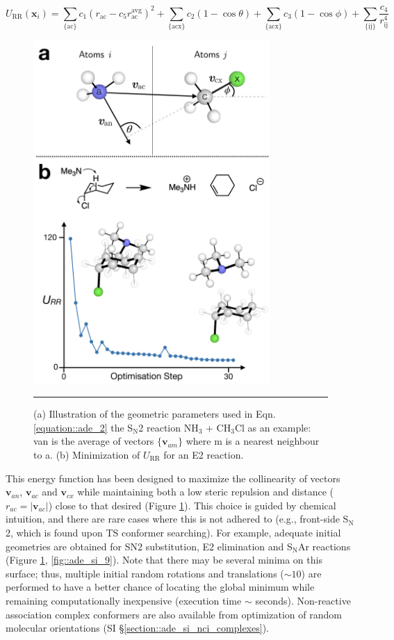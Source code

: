 \documentclass[../../main.tex]{subfiles}
\begin{document}
\begin{equation}
	U_\text{RR}(\boldsymbol{x}_i) = \sum_\text{\{ac\}} c_1 (r_\text{ac} - c_5 r_\text{ac}^\text{avg})^2 + \sum_\text{\{acx\}} c_2 (1 - \cos\theta) + \sum_\text{\{acx\}} c_3 (1 - \cos\phi) + \sum_\text{\{ij\}} \frac{c_4}{r_\text{ij}^4}
	\label{equation::ade_3}
\end{equation}


\begin{figure}[h!]
	\vspace{0.4cm}
	\centering
	\includegraphics[width=9cm]{5/autode/figs/fig4}
	\vspace{0.3cm}
	\hrule
	\caption{(a) Illustration of the geometric parameters used in Eqn. \eqref{equation::ade_2} the S$_\text{N}$2 reaction NH$_3$ + CH$_3$Cl as an example: van is the average of vectors $\{\boldsymbol{v}_{am}\}$ where m is a nearest neighbour to a. (b) Minimization of $U_\text{RR}$  for an E2 reaction.}
	\label{fig::ade_4}
\end{figure}

This energy function has been designed to maximize the collinearity of vectors $\boldsymbol{v}_{an}$, $\boldsymbol{v}_{ac}$ and $\boldsymbol{v}_{cx}$ while maintaining both a low steric repulsion and distance ($r_{ac} = |\boldsymbol{v}_{ac}|$) close to that desired (Figure \ref{fig::ade_4}). This choice is guided by chemical intuition, and there are rare cases where this is not adhered to (e.g., front-side S$_\text{N}$2,\cite{Hamlin2018} which is found upon TS conformer searching). For example, adequate initial geometries are obtained for SN2 substitution, E2 elimination and S$_\text{N}$Ar reactions (Figure \ref{fig::ade_4}, \ref{fig::ade_si_9}). Note that there may be several minima on this surface; thus, multiple initial random rotations and translations ($\sim 10$) are performed to have a better chance of locating the global minimum while remaining computationally inexpensive (execution time $\sim$ seconds). Non-reactive association complex conformers are also available from optimization of random molecular orientations (SI §\ref{section::ade_si_nci_complexes}).
\end{document}
